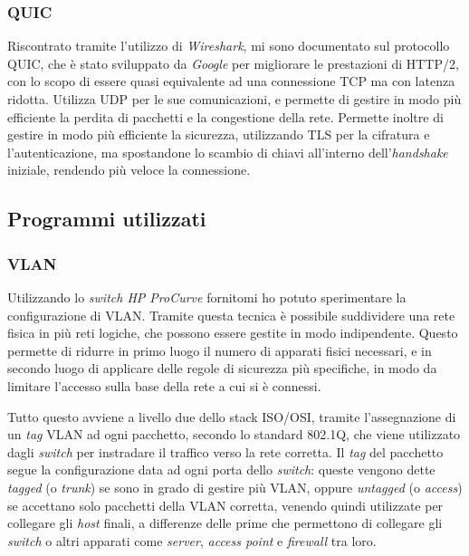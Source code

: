 \subsubsection{QUIC}

Riscontrato tramite l'utilizzo di \emph{Wireshark}, mi sono documentato sul protocollo QUIC\cite{site:cloudflare-quic}, che è stato sviluppato da \emph{Google} per migliorare le prestazioni di HTTP/2, con lo scopo di essere quasi equivalente ad una connessione TCP ma con latenza ridotta. Utilizza UDP per le sue comunicazioni, e permette di gestire in modo più efficiente la perdita di pacchetti e la congestione della rete. Permette inoltre di gestire in modo più efficiente la sicurezza, utilizzando TLS per la cifratura e l'autenticazione, ma spostandone lo scambio di chiavi all'interno dell'\emph{handshake} iniziale, rendendo più veloce la connessione.

\subsection{Programmi utilizzati}

\subsubsection{VLAN}

Utilizzando lo \emph{switch HP ProCurve} fornitomi ho potuto sperimentare la configurazione di VLAN. Tramite questa tecnica è possibile suddividere una rete fisica in più reti logiche, che possono essere gestite in modo indipendente. Questo permette di ridurre in primo luogo il numero di apparati fisici necessari, e in secondo luogo di applicare delle regole di sicurezza più specifiche, in modo da limitare l'accesso sulla base della rete a cui si è connessi.

Tutto questo avviene a livello due dello stack ISO/OSI, tramite l'assegnazione di un \emph{tag} VLAN ad ogni pacchetto, secondo lo standard 802.1Q, che viene utilizzato dagli \emph{switch} per instradare il traffico verso la rete corretta. Il \emph{tag} del pacchetto segue la configurazione data ad ogni porta dello \emph{switch}: queste vengono dette \emph{tagged} (o \emph{trunk}) se sono in grado di gestire più VLAN, oppure \emph{untagged} (o \emph{access}) se accettano solo pacchetti della VLAN corretta, venendo quindi utilizzate per collegare gli \emph{host} finali, a differenze delle prime che permettono di collegare gli \emph{switch} o altri apparati come \emph{server}, \emph{access point} e \emph{firewall} tra loro.


